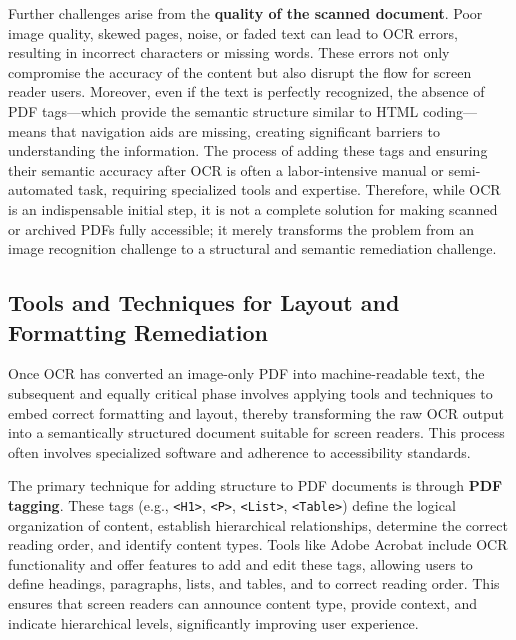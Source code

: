 Further challenges arise from the \textbf{quality of the scanned document}. Poor image quality, skewed pages, noise, or faded text can lead to OCR errors, resulting in incorrect characters or missing words. These errors not only compromise the accuracy of the content but also disrupt the flow for screen reader users. Moreover, even if the text is perfectly recognized, the absence of PDF tags—which provide the semantic structure similar to HTML coding—means that navigation aids are missing, creating significant barriers to understanding the information. The process of adding these tags and ensuring their semantic accuracy after OCR is often a labor-intensive manual or semi-automated task, requiring specialized tools and expertise. Therefore, while OCR is an indispensable initial step, it is not a complete solution for making scanned or archived PDFs fully accessible; it merely transforms the problem from an image recognition challenge to a structural and semantic remediation challenge.

\subsection{Tools and Techniques for Layout and Formatting Remediation}

Once OCR has converted an image-only PDF into machine-readable text, the subsequent and equally critical phase involves applying tools and techniques to embed correct formatting and layout, thereby transforming the raw OCR output into a semantically structured document suitable for screen readers. This process often involves specialized software and adherence to accessibility standards.

The primary technique for adding structure to PDF documents is through \textbf{PDF tagging}. These tags (e.g., \texttt{<H1>}, \texttt{<P>}, \texttt{<List>}, \texttt{<Table>}) define the logical organization of content, establish hierarchical relationships, determine the correct reading order, and identify content types. Tools like Adobe Acrobat include OCR functionality and offer features to add and edit these tags, allowing users to define headings, paragraphs, lists, and tables, and to correct reading order. This ensures that screen readers can announce content type, provide context, and indicate hierarchical levels, significantly improving user experience.

